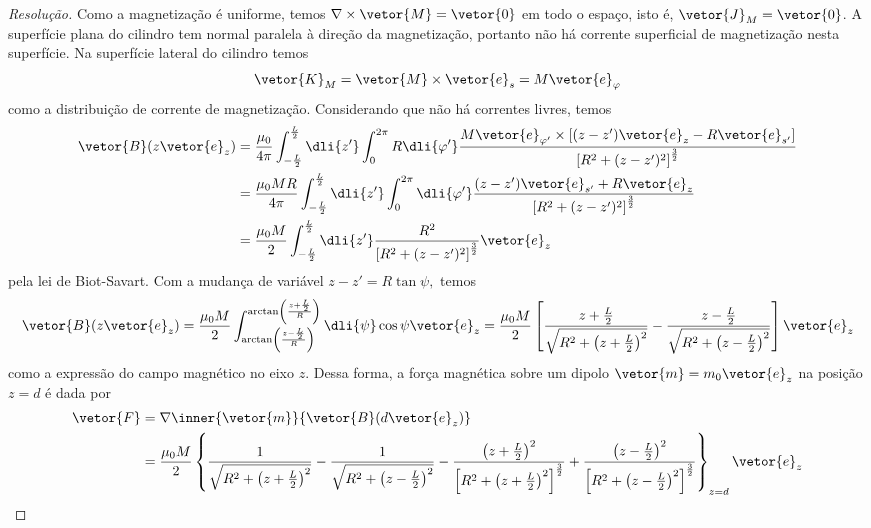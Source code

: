 \begin{proof}[Resolução]
    Como a magnetização é uniforme, temos \(\nabla \times \vetor{M} = \vetor{0}\) em todo o espaço, isto é, \(\vetor{J}_M = \vetor{0}\). A superfície plana do cilindro tem normal paralela à direção da magnetização, portanto não há corrente superficial de magnetização nesta superfície. Na superfície lateral do cilindro temos
    \begin{equation*}
        \vetor{K}_M = \vetor{M} \times \vetor{e}_s = M \vetor{e}_\varphi
    \end{equation*}
    como a distribuição de corrente de magnetização. Considerando que não há correntes livres, temos
    \begin{align*}
        \vetor{B}(z \vetor{e}_z) &= \frac{\mu_0}{4\pi} \int_{-\frac{L}{2}}^{\frac{L}{2}}\dli{z'}\int_{0}^{2\pi} R \dli{\varphi'} \frac{M \vetor{e}_{\varphi'} \times \left[(z - z')\vetor{e}_z- R \vetor{e}_{s'}\right]}{\left[R^2 + (z - z')^2\right]^{\frac32}}\\
                                 &= \frac{\mu_0 M R}{4\pi} \int_{-\frac{L}{2}}^{\frac{L}{2}} \dli{z'} \int_0^{2\pi} \dli{\varphi'} \frac{(z - z')\vetor{e}_{s'} + R \vetor{e}_z}{\left[R^2 + (z - z')^2\right]^{\frac32}}\\
                                 &= \frac{\mu_0 M}{2} \int_{-\frac{L}{2}}^{\frac{L}{2}} \dli{z'}  \frac{R^2}{\left[R^2 + (z - z')^2\right]^{\frac32}}\vetor{e}_z
    \end{align*}
    pela lei de Biot-Savart. Com a mudança de variável \(z - z' = R \tan\psi,\) temos
    \begin{equation*}
        \vetor{B}(z\vetor{e}_z) = \frac{\mu_0 M}{2} \int_{\arctan\left(\frac{z - \frac{L}{2}}{R}\right)}^{\arctan\left(\frac{z + \frac{L}{2}}{R}\right)} \dli{\psi} \cos\psi \vetor{e}_z = \frac{\mu_0 M}{2}\left[\frac{z + \frac{L}{2}}{\sqrt{R^2 + \left(z + \frac{L}{2}\right)^2}} - \frac{z - \frac{L}{2}}{\sqrt{R^2 + \left(z - \frac{L}{2}\right)^2}}\right]\vetor{e}_z
    \end{equation*}
    como a expressão do campo magnético no eixo \(z\). Dessa forma, a força magnética sobre um dipolo \(\vetor{m} = m_0\vetor{e}_z\) na posição \(z = d\) é dada por
    \begin{align*}
        \vetor{F} &= \nabla \inner{\vetor{m}}{\vetor{B}(d\vetor{e}_z)}\\
                  &= \frac{\mu_0 M}{2}\left\{\frac{1}{\sqrt{R^2 + \left(z + \frac{L}{2}\right)^2}} - \frac{1}{\sqrt{R^2 + \left(z - \frac{L}{2}\right)^2}} - \frac{\left(z + \frac{L}{2}\right)^2}{\left[R^2 + \left(z + \frac{L}{2}\right)^2\right]^{\frac32}} + \frac{\left(z - \frac{L}{2}\right)^2}{\left[R^2 + \left(z - \frac{L}{2}\right)^2\right]^{\frac32}}\right\}_{z = d}\vetor{e}_z\\

\end{align*}
\end{proof}
